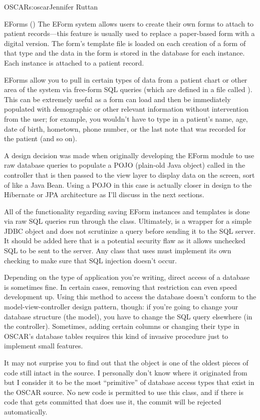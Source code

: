 \begin{aosachapter}{OSCAR}{s:oscar}{Jennifer Ruttan}
\begin{aosasect1}{EForms ()}
The EForm system allows users to create their own forms to attach to
patient records---this feature is usually used to replace a
paper-based form with a digital version. The form's template file is
loaded on each creation of a form of that type and the data in the
form is stored in the database for each instance. Each instance is
attached to a patient record.

EForms allow you to pull in certain types of data from a patient chart
or other area of the system via free-form SQL queries (which are
defined in a file called ). This can be extremely
useful as a form can load and then be immediately populated with
demographic or other relevant information without intervention from
the user; for example, you wouldn't have to type in a patient's name,
age, date of birth, hometown, phone number, or the last note that was
recorded for the patient (and so on).

A design decision was made when originally developing the EForm module
to use raw database queries to populate a POJO (plain-old Java object)
called  in the controller that is then passed to the view
layer to display data on the screen, sort of like a Java Bean. Using a
POJO in this case is actually closer in design to the Hibernate or JPA
architecture as I'll discuss in the next sections.

All of the functionality regarding saving EForm instances and
templates is done via raw SQL queries run through the 
class. Ultimately,  is a wrapper for a simple JDBC
object and does not scrutinize a query before sending it to the SQL
server. It should be added here that  is a potential
security flaw as it allows unchecked SQL to be sent to the server. Any
class that uses
 must implement its own checking to make sure that SQL
injection doesn't occur.

Depending on the type of application you're writing, direct access of
a database is sometimes fine. In certain cases, removing that
restriction can even speed development up. Using this method to access
the database doesn't conform to the model-view-controller design
pattern, though: if you're going to change your database structure
(the model), you have to change the SQL query elsewhere (in the
controller). Sometimes, adding certain columns or changing their type
in OSCAR's database tables requires this kind of invasive procedure
just to implement small features.

It may not surprise you to find out that the  object
is one of the oldest pieces of code still intact in the source. I
personally don't know where it originated from but I consider it to be
the most ``primitive'' of database access types that exist in the
OSCAR source. No new code is permitted to use this class, and if there
is code that gets committed that does use it, the commit will be
rejected automatically.


\end{aosasect1}
\end{aosachapter}

